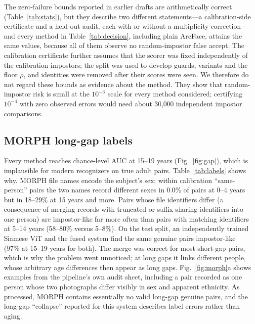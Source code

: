 \documentclass[journal]{IEEEtran}
\begin{document}
The zero-failure bounds reported in earlier drafts are arithmetically correct (Table~\ref{tab:stats}), but they describe two different statements---a calibration-side certificate and a held-out audit, each with or without a multiplicity correction---and every method in Table~\ref{tab:decision}, including plain ArcFace, attains the same values, because all of them observe no random-impostor false accept. The calibration certificate further assumes that the scorer was fixed independently of the calibration impostors; the split was used to develop guards, variants and the floor $\rho$, and identities were removed after their scores were seen. We therefore do not regard these bounds as evidence about the method. They show that random-impostor risk is small at the $10^{-3}$ scale for every method considered; certifying $10^{-4}$ with zero observed errors would need about 30,000 independent impostor comparisons.



\subsection{MORPH long-gap labels}
\label{sec:labels}
Every method reaches chance-level AUC at 15--19 years (Fig.~\ref{fig:gap}), which is implausible for modern recognizers on true adult pairs. Table~\ref{tab:labels} shows why. MORPH file names encode the subject's sex; within calibration ``same-person'' pairs the two names record different sexes in 0.0\% of pairs at 0--4 years but in 18--29\% at 15 years and more. Pairs whose file identifiers differ (a consequence of merging records with truncated or suffix-sharing identifiers into one person) are impostor-like far more often than pairs with matching identifiers at 5--14 years (58--80\% versus 5--8\%). On the test split, an independently trained Siamese ViT and the fused system find the same genuine pairs impostor-like (97\% at 15--19 years for both). The merge was correct for most short-gap pairs, which is why the problem went unnoticed; at long gaps it links different people, whose arbitrary age differences then appear as long gaps. Fig.~\ref{fig:morph}a shows examples from the pipeline's own audit sheet, including a pair recorded as one person whose two photographs differ visibly in sex and apparent ethnicity. As processed, MORPH contains essentially no valid long-gap genuine pairs, and the long-gap ``collapse'' reported for this system describes label errors rather than aging.


\end{document}
